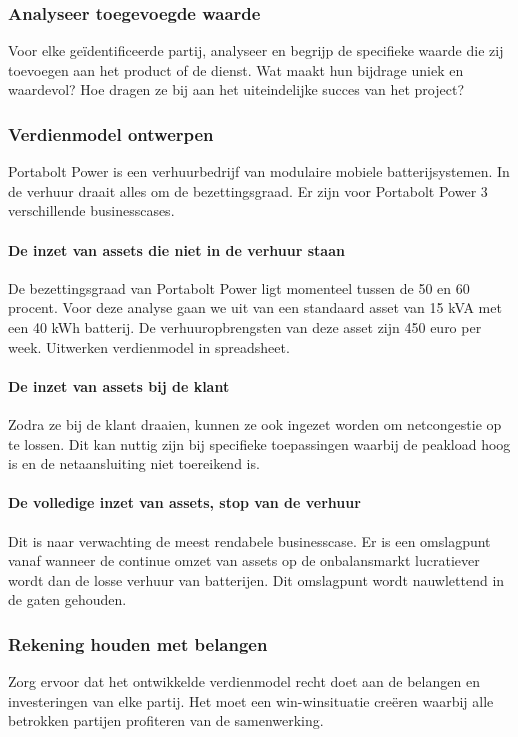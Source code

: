 \documentclass[../main.tex]{subfiles}
\begin{document}
\subsubsection{Analyseer toegevoegde waarde}
Voor elke geïdentificeerde partij, analyseer en begrijp de specifieke waarde die zij toevoegen aan het product of de dienst. Wat maakt hun bijdrage uniek en waardevol? Hoe dragen ze bij aan het uiteindelijke succes van het project?

\subsubsection{Verdienmodel ontwerpen}
Portabolt Power is een verhuurbedrijf van modulaire mobiele batterijsystemen. In de verhuur draait alles om de bezettingsgraad. Er zijn voor Portabolt Power 3 verschillende businesscases.

\paragraph{De inzet van assets die niet in de verhuur staan}
De bezettingsgraad van Portabolt Power ligt momenteel tussen de 50 en 60 procent. Voor deze analyse gaan we uit van een standaard asset van 15 kVA met een 40 kWh batterij. De verhuuropbrengsten van deze asset zijn 450 euro per week. Uitwerken verdienmodel in spreadsheet.

\paragraph{De inzet van assets bij de klant}
Zodra ze bij de klant draaien, kunnen ze ook ingezet worden om netcongestie op te lossen. Dit kan nuttig zijn bij specifieke toepassingen waarbij de peakload hoog is en de netaansluiting niet toereikend is.

\paragraph{De volledige inzet van assets, stop van de verhuur}
Dit is naar verwachting de meest rendabele businesscase. Er is een omslagpunt vanaf wanneer de continue omzet van assets op de onbalansmarkt lucratiever wordt dan de losse verhuur van batterijen. Dit omslagpunt wordt nauwlettend in de gaten gehouden.

\subsubsection{Rekening houden met belangen}
Zorg ervoor dat het ontwikkelde verdienmodel recht doet aan de belangen en investeringen van elke partij. Het moet een win-winsituatie creëren waarbij alle betrokken partijen profiteren van de samenwerking.
\end{document}
